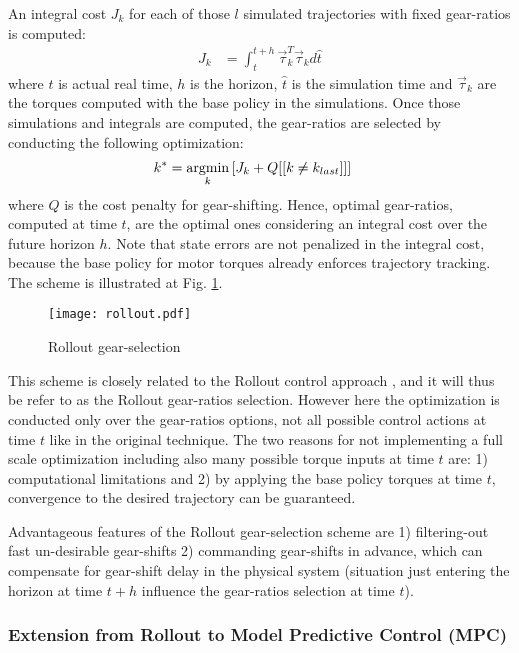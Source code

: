 An integral cost $J_k$ for each of those $l$ simulated trajectories with fixed gear-ratios is computed:
%
\begin{align}
J_k &= \int_t^{t+h} \vec{\tau}_k^T \vec{\tau}_k d\hat{t}
\end{align}
%
where $t$ is actual real time, $h$ is the horizon, $\hat{t}$ is the simulation time and $\vec{\tau}_k$ are the torques computed with the base policy in the simulations. Once those simulations and integrals are computed, the gear-ratios are selected by conducting the following optimization:
%
\begin{align}
k^{*}      &= \operatornamewithlimits{argmin}\limits_{k} \left[ J_k + Q [[ k \neq k_{last}]] \right] %
\end{align}
%
where $Q$ is the cost penalty for gear-shifting. Hence, optimal gear-ratios, computed at time $t$, are the optimal ones considering an integral cost over the future horizon $h$. Note that state errors are not penalized in the integral cost, because the base policy for motor torques already enforces trajectory tracking. The scheme is illustrated at Fig. \ref{fig:rollout}.
%
\begin{figure}[htp]
	\centering
		\texttt{[image: rollout.pdf]}
	\caption[Rollout gear-selection]{Rollout gear-selection}
	\label{fig:rollout}
\end{figure}


This scheme is closely related to the Rollout control approach \cite{bertsekas_dynamic_2000}, and it will thus be refer to as the Rollout gear-ratios selection.  However here the optimization is conducted only over the gear-ratios options, not all possible control actions at time $t$ like in the original technique. The two reasons for not implementing a full scale optimization including also many possible torque inputs at time $t$ are: 1) computational limitations and 2) by applying the base policy torques at time $t$, convergence to the desired trajectory can be guaranteed. 

Advantageous features of the Rollout gear-selection scheme are 1) filtering-out fast un-desirable gear-shifts 2) commanding gear-shifts in advance, which can compensate for gear-shift delay in the physical system (situation just entering the horizon at time $t+h$ influence the gear-ratios selection at time $t$).

\subsubsection{Extension from Rollout to Model Predictive Control (MPC)}

